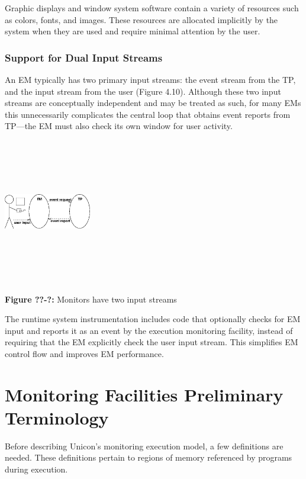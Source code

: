 Graphic displays and window system software contain a variety of
resources such as colors, fonts, and images.  These resources are
allocated implicitly by the system when they are used and require
minimal attention by the user.

\subsubsection{Support for Dual Input Streams}

An EM typically has two primary input streams: the event stream from
the TP, and the input stream from the user (Figure 4.10).  Although
these two input streams are conceptually independent and may be
treated as such, for many EMs this unnecessarily complicates
the central loop that obtains event reports from TP---the EM must
also check its own window for user activity.

\begin{center}
\includegraphics[width=1.5in,height=2.5in]{eventstr.png}
\end{center}

{\sffamily\bfseries Figure ??-?:}
{\sffamily Monitors have two input streams}

\bigskip


The runtime system instrumentation includes code that optionally
checks for EM input and reports it as an event by the execution
monitoring facility, instead of requiring that the EM explicitly check
the user input stream.  This simplifies EM control 
flow and improves EM performance.


\section{Monitoring Facilities Preliminary Terminology}

Before describing Unicon's monitoring execution model, a few definitions
are needed.  These definitions pertain to regions of memory referenced
by programs during execution.


